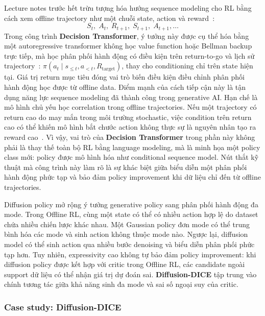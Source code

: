 Lecture notes trước hết trừu tượng hóa hướng sequence modeling cho RL bằng cách xem offline trajectory như một chuỗi state, action và reward~\cite{eysenbach2025generativerl}:
\[
    S_t,\; A_t,\; R_{t+1},\; S_{t+1},\; A_{t+1},\ldots
\]
Trong công trình \textbf{Decision Transformer}, ý tưởng này được cụ thể hóa bằng một autoregressive transformer không học value function hoặc Bellman backup trực tiếp, mà học phân phối hành động có điều kiện trên return-to-go và lịch sử trajectory~\cite{chen2021decision}:
$\pi(a_t\mid s_{\leq t},a_{<t},R_{\mathrm{target}})$, thay cho conditioning chỉ trên state hiện tại.
Giá trị return mục tiêu đóng vai trò biến điều kiện điều chỉnh phân phối hành động học được từ offline data.
Điểm mạnh của cách tiếp cận này là tận dụng năng lực sequence modeling đã thành công trong generative AI.
Hạn chế là mô hình chủ yếu học correlation trong offline trajectories.
Nếu một trajectory có return cao do may mắn trong môi trường stochastic, việc condition trên return cao có thể khiến mô hình bắt chước action không thực sự là nguyên nhân tạo ra reward cao~\cite{paster2022luck}.
Vì vậy, vai trò của \textbf{Decision Transformer} trong phần này không phải là thay thế toàn bộ RL bằng language modeling, mà là minh họa một policy class mới: policy được mô hình hóa như conditional sequence model.
Nút thắt kỹ thuật mà công trình này làm rõ là sự khác biệt giữa biểu diễn một phân phối hành động phức tạp và bảo đảm policy improvement khi dữ liệu chỉ đến từ offline trajectories.

Diffusion policy mở rộng ý tưởng generative policy sang phân phối hành động đa mode.
Trong Offline RL, cùng một state có thể có nhiều action hợp lệ do dataset chứa nhiều chiến lược khác nhau.
Một Gaussian policy đơn mode có thể trung bình hóa các mode và sinh action không thuộc mode nào.
Ngược lại, diffusion model có thể sinh action qua nhiều bước denoising và biểu diễn phân phối phức tạp hơn.
Tuy nhiên, expressivity cao không tự bảo đảm policy improvement: khi diffusion policy được kết hợp với critic trong Offline RL, các candidate ngoài support dữ liệu có thể nhận giá trị dự đoán sai.
\textbf{Diffusion-DICE} tập trung vào chính tương tác giữa khả năng sinh đa mode và sai số ngoại suy của critic.

\subsubsection{Case study: Diffusion-DICE}


